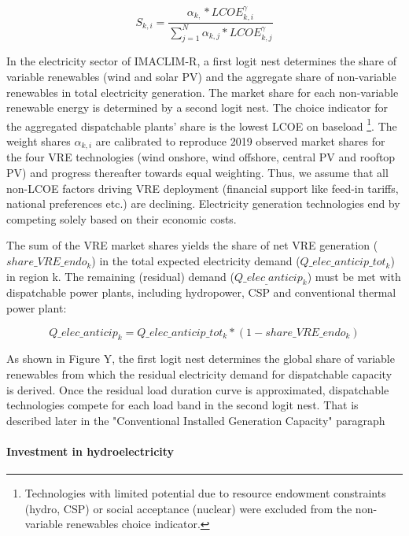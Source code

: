 \begin{dmath}
    S_{k,i} = \frac{\alpha_{k,}*LCOE_{k,i}^{\gamma}}{\sum_{j=1}^{N} \alpha_{k,j}*LCOE_{k,j}^{\gamma}}
    \label{eqn:MMLFVRE}
\end{dmath}

In the electricity sector of IMACLIM-R, a first logit nest determines the share of variable renewables (wind and solar PV) and the aggregate share of non-variable renewables in total electricity generation. The market share for each non-variable renewable energy is determined by a second logit nest.
The choice indicator for the aggregated dispatchable plants’ share is the lowest LCOE on baseload
\footnote{Technologies with limited potential due to resource endowment constraints (hydro, CSP) or social acceptance (nuclear) were excluded from the non-variable renewables choice indicator.}. The weight shares $\alpha_{k,i}$ are calibrated to reproduce 2019 observed market shares for the four VRE technologies (wind onshore, wind offshore, central PV and rooftop PV) and progress thereafter towards equal weighting. Thus, we assume that all non-LCOE factors driving VRE deployment (financial support like feed-in tariffs, national preferences etc.) are declining. Electricity generation technologies end by competing solely based on their economic costs.

The sum of the VRE market shares yields the share of net VRE generation ($share\_VRE\_endo_k$) in the total expected electricity demand ($Q\_elec\_anticip\_tot_k$)  in region k. The remaining (residual) demand ($Q\_elec_\_anticip_k$) must be met with dispatchable power plants, including hydropower, CSP and conventional thermal power plant:

\begin{dmath}
    Q\_elec\_anticip_k = Q\_elec\_anticip\_tot_k*(1 - share\_VRE\_endo_{k})
    \label{eqn:Q_elec}
\end{dmath}

As shown in Figure Y, the first logit nest determines the global share of variable renewables from which the residual electricity demand for dispatchable capacity is derived. Once the residual load duration curve is approximated, dispatchable technologies compete for each load band in the second logit nest. That is described later in the "Conventional Installed Generation Capacity" paragraph


\paragraph{Investment in hydroelectricity}

